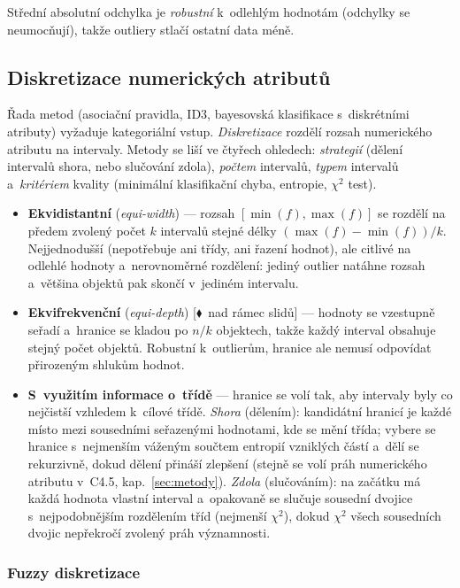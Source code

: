 \documentclass[11pt,a4paper]{article}
\theoremstyle{definition}
\newcommand{\mimo}{\textcolor{markcol}{\textsf{\footnotesize[$\blacklozenge$~nad rámec slidů]}}}
\begin{document}
Střední absolutní odchylka je \emph{robustní} k~odlehlým hodnotám (odchylky se neumocňují),
takže outliery stlačí ostatní data méně.

\subsection{Diskretizace numerických atributů}

Řada metod (asociační pravidla, ID3, bayesovská klasifikace s~diskrétními atributy)
vyžaduje kategoriální vstup. \emph{Diskretizace} rozdělí rozsah numerického atributu na
intervaly. Metody se liší ve čtyřech ohledech: \emph{strategií} (dělení intervalů shora,
nebo slučování zdola), \emph{počtem} intervalů, \emph{typem} intervalů a~\emph{kritériem}
kvality (minimální klasifikační chyba, entropie, $\chi^2$ test).

\begin{itemize}
\item \textbf{Ekvidistantní} (\emph{equi-width}) --- rozsah $[\min(f),\max(f)]$ se rozdělí
      na předem zvolený počet $k$ intervalů stejné délky $(\max(f)-\min(f))/k$.
      Nejjednodušší (nepotřebuje ani třídy, ani řazení hodnot), ale citlivé na odlehlé
      hodnoty a~nerovnoměrné rozdělení: jediný outlier natáhne rozsah a~většina objektů pak
      skončí v~jediném intervalu.
\item \textbf{Ekvifrekvenční} (\emph{equi-depth}) \mimo{} --- hodnoty se vzestupně seřadí
      a~hranice se kladou po $n/k$ objektech, takže každý interval obsahuje stejný počet
      objektů. Robustní k~outlierům, hranice ale nemusí odpovídat přirozeným shlukům
      hodnot.
\item \textbf{S~využitím informace o~třídě} --- hranice se volí tak, aby intervaly byly co
      nejčistší vzhledem k~cílové třídě. \emph{Shora} (dělením): kandidátní hranicí je
      každé místo mezi sousedními seřazenými hodnotami, kde se mění třída; vybere se
      hranice s~nejmenším váženým součtem entropií vzniklých částí a~dělí se rekurzivně,
      dokud dělení přináší zlepšení (stejně se volí práh numerického atributu v~C4.5,
      kap.~\ref{sec:metody}). \emph{Zdola} (slučováním): na začátku má každá hodnota
      vlastní interval a~opakovaně se slučuje sousední dvojice s~nejpodobnějším rozdělením
      tříd (nejmenší $\chi^2$), dokud $\chi^2$ všech sousedních dvojic nepřekročí zvolený
      práh významnosti.
\end{itemize}

\subsubsection{Fuzzy diskretizace}
\end{document}
